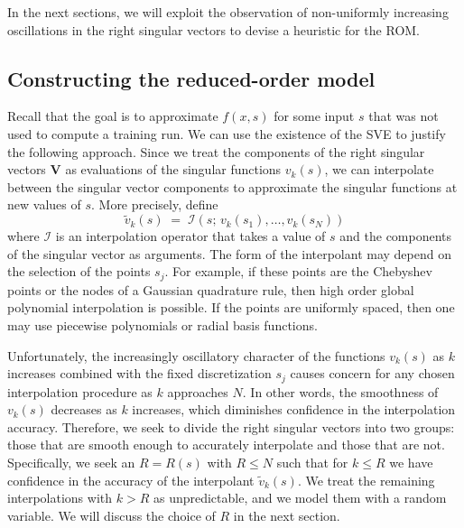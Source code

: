 \documentclass[final]{siamltex}
\providecommand{\mat}[1]{\boldsymbol{#1}}
\providecommand{\mV}{\ensuremath{\mat{V}}}
\begin{document}
In the next sections, we will exploit the observation of non-uniformly
increasing oscillations in the right singular vectors to devise a
heuristic for the ROM.

\subsection{Constructing the reduced-order model}
Recall that the goal is to approximate $f(x,s)$ for some input $s$
that was not used to compute a training run. We can use the existence
of the SVE to justify the following approach.  Since we treat the
components of the right singular vectors $\mV$ as evaluations of the
singular functions $v_k(s)$, we can interpolate between the singular
vector components to approximate the singular functions at new values
of $s$. More precisely, define
\begin{equation}
\label{eq:interp}
\tilde{v}_k(s) \;=\; {\mathcal{I}}(s;\,v_k(s_1),\dots,v_k(s_N))
\end{equation}
where ${\mathcal{I}}$ is an interpolation operator that takes a value of $s$ and
the components of the singular vector as arguments. The form of the
interpolant may depend on the selection of the points $s_j$. For
example, if these points are the Chebyshev points or the nodes of a
Gaussian quadrature rule, then high order global polynomial
interpolation is possible. If the points are uniformly spaced, then
one may use piecewise polynomials or radial basis functions.

Unfortunately, the increasingly oscillatory character of the functions
$v_k(s)$ as $k$ increases combined with the fixed discretization $s_j$
causes concern for any chosen interpolation procedure as $k$
approaches $N$. In other words, the smoothness of $v_k(s)$ decreases
as $k$ increases, which diminishes confidence in the interpolation
accuracy.  Therefore, we seek to divide the right singular vectors
into two groups: those that are smooth enough to accurately
interpolate and those that are not. Specifically, we seek an $R=R(s)$
with $R\leq N$ such that for $k\leq R$ we have confidence in the
accuracy of the interpolant $\tilde{v}_k(s)$. We treat the remaining
interpolations with $k>R$ as unpredictable, and we model them with a
random variable. We will discuss the choice of $R$ in the next
section.
\end{document}
